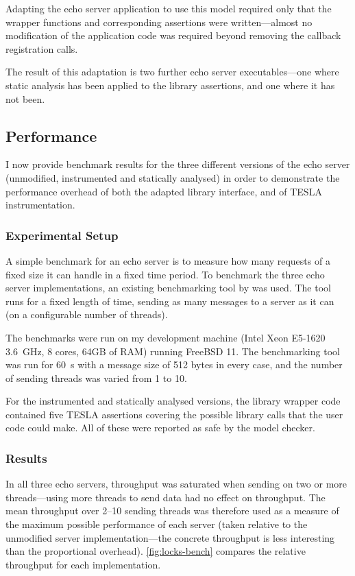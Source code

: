 Adapting the echo server application to use this model required only that the
wrapper functions and corresponding assertions were written---almost no
modification of the application code was required beyond removing the callback
registration calls.

The result of this adaptation is two further echo server executables---one where
static analysis has been applied to the library assertions, and one where it has
not been.

\subsection{Performance}

I now provide benchmark results for the three different versions of the echo
server (unmodified, instrumented and statically analysed) in order to
demonstrate the performance overhead of both the adapted library interface, and
of TESLA instrumentation.

\subsubsection{Experimental Setup}

A simple benchmark for an echo server is to measure how many requests of a fixed
size it can handle in a fixed time period. To benchmark the three echo server
implementations, an existing benchmarking tool by \textcite{hoyer_rust_2016} was
used. The tool runs for a fixed length of time, sending as many messages to a
server as it can (on a configurable number of threads).

The benchmarks were run on my development machine (Intel Xeon E5-1620
\SI{3.6}{\GHz}, 8 cores, 64GB of RAM) running FreeBSD 11. The benchmarking tool
was run for \SI{60}{\s} with a message size of 512 bytes in every case, and the
number of sending threads was varied from 1 to 10.

For the instrumented and statically analysed versions, the library wrapper code
contained five TESLA assertions covering the possible library calls that the
user code could make. All of these were reported as safe by the model checker.

\subsubsection{Results}

In all three echo servers, throughput was saturated when sending on two or more
threads---using more threads to send data had no effect on throughput. The mean
throughput over 2--10 sending threads was therefore used as a measure of the
maximum possible performance of each server (taken relative to the unmodified
server implementation---the concrete throughput is less interesting than the
proportional overhead). \autoref{fig:locks-bench} compares the relative
throughput for each implementation.

